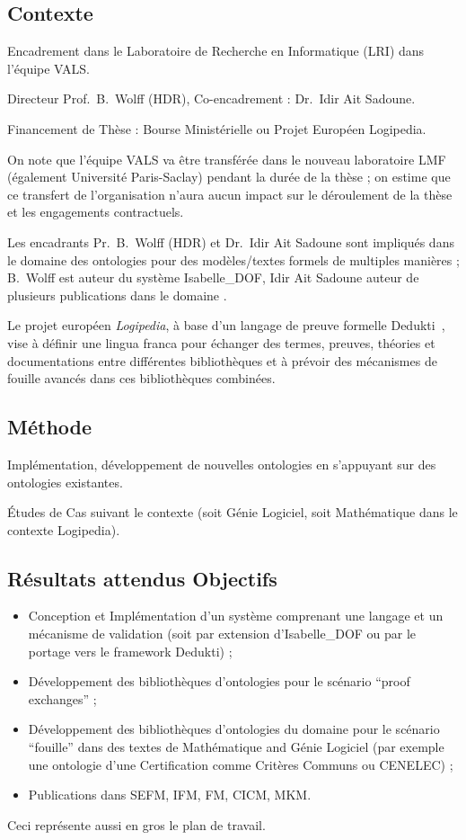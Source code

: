 \documentclass[a4paper,10pt]{article}
\begin{document}
\subsection*{Contexte}

Encadrement dans le Laboratoire de Recherche en Informatique (LRI)
dans l'équipe VALS\@.

Directeur Prof.\ B.\ Wolff (HDR), Co-encadrement : Dr.\ Idir Ait Sadoune.

Financement de Thèse : Bourse Ministérielle ou Projet Européen Logipedia.

On note que l'équipe VALS va être transférée
dans le nouveau laboratoire LMF (également Université Paris-Saclay)
pendant la durée de la thèse ;
on estime que ce transfert de l'organisation n'aura aucun impact
sur le déroulement de la thèse et les engagements contractuels.

Les encadrants Pr.\ B.\ Wolff (HDR) et Dr.\ Idir Ait Sadoune sont impliqués
dans le domaine des ontologies pour des modèles/textes formels
de multiples manières ;
B.\ Wolff est auteur du système Isabelle\_DOF,
Idir Ait Sadoune auteur de plusieurs publications dans le domaine
\cite{DBLP:conf/medi/Ait-SadouneM19}.

Le projet européen \emph{Logipedia},
à base d'un langage de preuve formelle Dedukti~\cite{dedukti}, vise
à définir une lingua franca
pour échanger des termes, preuves, théories et documentations
entre différentes bibliothèques
et à prévoir des mécanismes de fouille avancés
dans ces bibliothèques combinées.

\subsection*{Méthode}

Implémentation, développement de nouvelles ontologies
en s'appuyant sur des ontologies existantes.

Études de Cas suivant le contexte
(soit Génie Logiciel, soit Mathématique dans le contexte Logipedia).

\subsection*{Résultats attendus \textendash{}  Objectifs}

\begin{itemize}
  \item
    Conception et Implémentation d'un système comprenant
    une langage et un mécanisme de validation
    (soit par extension d'Isabelle\_DOF
    ou par le portage vers le framework Dedukti) ;
  \item
    Développement des bibliothèques d'ontologies
    pour le scénario \enquote{proof exchanges} ;
  \item
    Développement des bibliothèques d'ontologies du domaine
    pour le scénario \enquote{fouille} dans des textes
    de Mathématique and Génie Logiciel
    (par exemple une ontologie
    d'une Certification comme Critères Communs ou CENELEC) ;
  \item
    Publications dans SEFM, IFM, FM, CICM, MKM\@.
\end{itemize}

Ceci représente aussi en gros le plan de travail.



\end{document}
